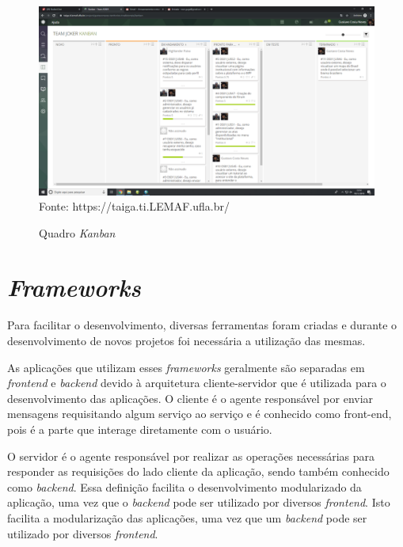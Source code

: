 \begin{figure}[H]
\centering
\caption{Quadro \textit{Kanban}} %
\includegraphics[scale=0.2]{quadroKanban}\\  %
{\small Fonte: https://taiga.ti.LEMAF.ufla.br/} %
\label{fig:kanban} %
\end{figure}

\section{\textit{Frameworks}}

Para facilitar o desenvolvimento, diversas ferramentas foram criadas e durante o desenvolvimento de novos projetos foi necessária a utilização das mesmas.

As aplicações que utilizam esses \textit{frameworks} geralmente são separadas em \textit{frontend} e \textit{backend} devido à arquitetura cliente-servidor que é utilizada para o desenvolvimento das aplicações. O cliente é o agente responsável por enviar mensagens requisitando algum serviço ao serviço e é conhecido como front-end, pois é a parte que interage diretamente com o usuário. 

O servidor é o agente responsável por realizar as operações necessárias para
responder as requisições do lado cliente da aplicação, sendo também conhecido
como \textit{backend}.
Essa definição facilita o desenvolvimento modularizado da aplicação, uma vez que o \textit{backend} pode ser utilizado por diversos \textit{frontend}. Isto facilita a modularização das aplicações, uma vez que um \textit{backend} pode ser utilizado por diversos \textit{frontend}.

